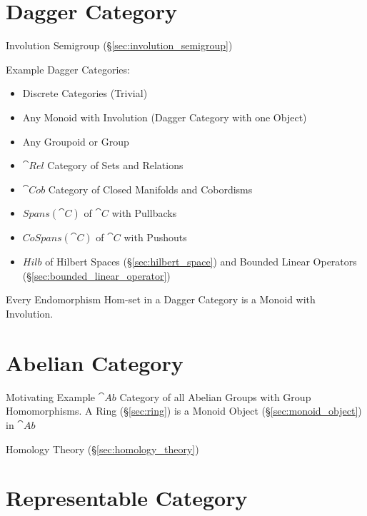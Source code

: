\section{Dagger Category}\label{sec:dagger_category}

Involution Semigroup (\S\ref{sec:involution_semigroup})

Example Dagger Categories:

\begin{itemize}

\item Discrete Categories (Trivial)
\item Any Monoid with Involution (Dagger Category with one Object)
\item Any Groupoid or Group
\item $\cat{Rel}$ Category of Sets and Relations
\item $\cat{Cob}$ Category of Closed Manifolds and Cobordisms
\item $Spans(\cat{C})$ of $\cat{C}$ with Pullbacks
\item $CoSpans(\cat{C})$ of $\cat{C}$ with Pushouts
\item $Hilb$ of Hilbert Spaces (\S\ref{sec:hilbert_space}) and Bounded
  Linear Operators (\S\ref{sec:bounded_linear_operator})

\end{itemize}

Every Endomorphism Hom-set in a Dagger Category is a Monoid with
Involution.



\section{Abelian Category}\label{sec:abelian_category}

Motivating Example $\cat{Ab}$ Category of all Abelian Groups with
Group Homomorphisms. A Ring (\S\ref{sec:ring}) is a Monoid Object
(\S\ref{sec:monoid_object}) in $\cat{Ab}$

Homology Theory (\S\ref{sec:homology_theory})



\section{Representable Category}\label{sec:representable_category}

